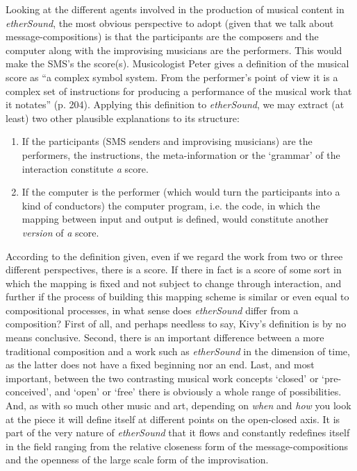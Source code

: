 Looking at the different agents involved in the production of musical content in \emph{etherSound}, the most obvious perspective to adopt (given that we talk about message-compositions) is that the participants are the composers and the computer along with the improvising musicians are the performers. This would make the SMS's the score(s). Musicologist Peter \citet[][]{kivy02} gives a definition of the musical score as ``a complex symbol system. From the performer's point of view it is a complex set of instructions for producing a performance of the musical work that it notates'' (p. 204). Applying this definition to \emph{etherSound}, we may extract (at least) two other plausible explanations to its structure:
%
\begin{enumerate} 
\item If the participants (SMS senders and improvising musicians) are   the performers, the instructions, the meta-information or the   `grammar' of the interaction constitute \emph{a} score. 
\item If the computer is the performer (which would turn the   participants into a kind of conductors) the computer program, i.e. the code,   in which the mapping between input and output is defined, would constitute   another \emph{version} of \emph{a} score. \end{enumerate}
%
According to the definition given, even if we regard the work from two or three different perspectives, there is a score. 
If there in fact is a score of some sort in which the mapping is fixed and not subject to change through interaction, and further if the process of building this mapping scheme is similar or even equal to compositional processes, in what sense does \emph{etherSound} differ from a composition? First of all, and perhaps needless to say, Kivy's definition is by no means conclusive. Second, there is an important difference between a more traditional composition and a work such as \emph{etherSound} in the dimension of time, as the latter does not have a fixed beginning nor an end. Last, and most important, between the two contrasting musical work concepts `closed' or `pre-conceived', and `open' or `free' there is obviously a whole range of possibilities. And, as with so much other music and art, depending on \emph{when} and \emph{how} you look at the piece it will define itself at different points on the open-closed axis. It is part of the very nature of \emph{etherSound} that it flows and constantly redefines itself in the field ranging from the relative closeness form of the message-compositions and the openness of the large scale form of the improvisation. 

